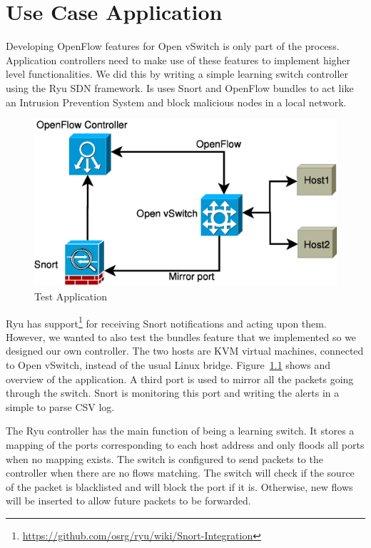 
\chapter{Use Case Application}
\label{chapter:app}

Developing OpenFlow features for Open vSwitch is only part of the process. Application controllers need to make
use of these features to implement higher level functionalities. We did this by writing a simple learning
switch controller using the Ryu\cite{ryu} SDN framework. Is uses Snort and OpenFlow bundles to act like an Intrusion
Prevention System and block malicious nodes in a local network.

\begin{figure}[h]
\begin{center}
\includegraphics[scale=0.5]{src/img/test-app.eps}
\end{center}
\caption{Test Application}
\label{fig:testapp}
\end{figure}

Ryu has support\footnote{\url{https://github.com/osrg/ryu/wiki/Snort-Integration}} for receiving Snort notifications and acting upon them.
However, we wanted to also test the bundles feature that we implemented so we designed our own controller. The two hosts
are KVM virtual machines, connected to Open vSwitch, instead of the usual Linux bridge. Figure~\ref{fig:testapp} shows and
overview of the application. A third port is used to mirror all the packets going through the switch. Snort is monitoring
this port and writing the alerts in a simple to parse CSV log.

The Ryu controller has the main function of being a learning switch. It stores a mapping of the ports corresponding to each host address
and only floods all ports when no mapping exists. The switch is configured to send packets to
the controller when there are no flows matching. The switch will check if the source of the
packet is blacklisted and will block the port if it is. Otherwise, new flows will be inserted
to allow future packets to be forwarded.


